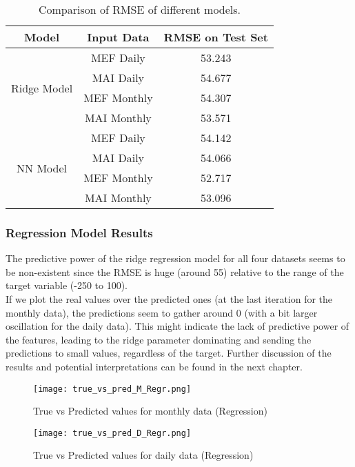 \documentclass{article}
\begin{document}
\begin{table}[H]
\centering
\begin{tabular}{|c|c|c|}
\hline
\textbf{Model} & \textbf{Input Data} & \textbf{RMSE on Test Set} \\ \hline
\multirow{4}{*}{Ridge Model} & MEF Daily & 53.243 \\ \cline{2-3} 
 & MAI Daily & 54.677 \\ \cline{2-3} 
 & MEF Monthly & 54.307 \\ \cline{2-3} 
 & MAI Monthly & 53.571 \\ \hline
\multirow{4}{*}{NN Model} & MEF Daily & 54.142 \\ \cline{2-3} 
 & MAI Daily & 54.066 \\ \cline{2-3} 
 & MEF Monthly & 52.717 \\ \cline{2-3} 
 & MAI Monthly & 53.096 \\ \hline
\end{tabular}
\caption{Comparison of RMSE of different models.}
\label{tab:RMSE}
\end{table}

\subsubsection{Regression Model Results}
The predictive power of the ridge regression model for all four datasets seems to be non-existent since the RMSE is huge (around 55) relative to the range of the target variable (-250 to 100).\\

If we plot the real values over the predicted ones (at the last iteration for the monthly data), the predictions seem to gather around 0 (with a bit larger oscillation for the daily data). This might indicate the lack of predictive power of the features, leading to the ridge parameter dominating and sending the predictions to small values, regardless of the target. Further discussion of the results and potential interpretations can be found in the next chapter. 

\begin{figure}[h]
    \centering
    \texttt{[image: true\_vs\_pred\_M\_Regr.png]}
    \caption{True vs Predicted values for monthly data (Regression)}
\end{figure}

\begin{figure}[h]
    \centering
    \texttt{[image: true\_vs\_pred\_D\_Regr.png]}
    \caption{True vs Predicted values for daily data (Regression)}
\end{figure}
\end{document}
